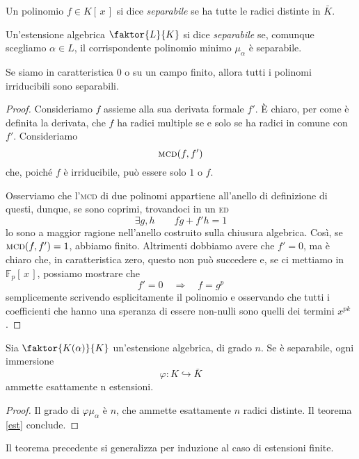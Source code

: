 \begin{multicols}{2}
	\begin{definition}[Separabile]
		Un polinomio $ f \in K[\,x\,] $ si dice \emph{separabile} se ha tutte le radici distinte in $ \bar{K} $.
		
		Un'estensione algebrica $ \faktor{L}{K} $ si dice \emph{separabile} se, comunque scegliamo $\alpha \in L  $, il corrispondente polinomio minimo $ \mu_\alpha $ è separabile.
	\end{definition}

\begin{theorem}
	Se siamo in caratteristica $ 0 $ o su un campo finito, allora tutti i polinomi irriducibili sono separabili.
\end{theorem}
\begin{proof}
	Consideriamo $ f $ assieme alla sua derivata formale $ f' $. \`{E} chiaro, per come è definita la derivata, che $ f $ ha radici multiple se e solo se ha radici in comune con $ f' $. Consideriamo
	$$  \textsc{mcd}(f, f')  $$
	che, poiché $ f $ è irriducibile, può essere solo $ 1 $ o $ f $.
	
	Osserviamo che l'\textsc{mcd} di due polinomi appartiene all'anello di definizione di questi, dunque, se sono coprimi, trovandoci in un \textsc{ed}
	\[ \exists g, h  \qquad fg +f'h = 1 \]
	lo sono a maggior ragione nell'anello costruito sulla chiusura algebrica. Così, se $  \textsc{mcd}(f, f') = 1  $, abbiamo finito. Altrimenti dobbiamo avere che $ f'=0 $, ma è chiaro che, in caratteristica zero, questo non può succedere e, se ci mettiamo in $ \mathbb{F}_p[\,x\,] $, possiamo mostrare che
	\[ f' = 0 \quad\Rightarrow\quad f = g^p \]
	semplicemente scrivendo esplicitamente il polinomio e osservando che tutti i coefficienti che hanno una speranza di essere non-nulli sono quelli dei termini $ x^{pk} $.
\end{proof}

\begin{theorem}\label{immsep}
	Sia $ \faktor{K(\alpha)}{K} $ un'estensione algebrica, di grado $ n $. Se è separabile, ogni immersione
	\[ \varphi: K \hookrightarrow \bar{K} \]
	ammette esattamente n estensioni.
\end{theorem}
\begin{proof}
	Il grado di $ \varphi\mu_\alpha $ è $ n $, che ammette esattamente $ n $ radici distinte. Il teorema \ref{est} conclude.
\end{proof}
\begin{remark}
	Il teorema precedente si generalizza per induzione al caso di estensioni finite.
\end{remark}


\end{multicols}
